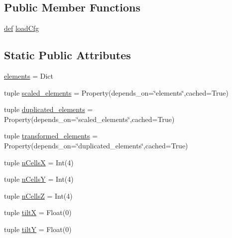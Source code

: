 \subsection*{Public Member Functions}
\begin{DoxyCompactItemize}
\item 
\hyperlink{sim_image_from_wave_8m_a72b6b8e83430abf007f20aeae4dc2f74}{def} \hyperlink{classpython_1_1models_1_1raw__models_1_1sample_1_1_sample_model_a1f0c650a5823ddfd6d9fe7aff8b706e1}{load\-Cfg}
\end{DoxyCompactItemize}
\subsection*{Static Public Attributes}
\begin{DoxyCompactItemize}
\item 
\hyperlink{classpython_1_1models_1_1raw__models_1_1sample_1_1_sample_model_a310457df13fa5efb5e41aae0e04e447f}{elements} = Dict
\item 
tuple \hyperlink{classpython_1_1models_1_1raw__models_1_1sample_1_1_sample_model_a967d917bff50ac2853db3ab230a001e6}{scaled\-\_\-elements} = Property(depends\-\_\-on=\char`\"{}elements\char`\"{},cached=True)
\item 
tuple \hyperlink{classpython_1_1models_1_1raw__models_1_1sample_1_1_sample_model_a7dad339f0323520b2952205f4dd16305}{duplicated\-\_\-elements} = Property(depends\-\_\-on=\char`\"{}scaled\-\_\-elements\char`\"{},cached=True)
\item 
tuple \hyperlink{classpython_1_1models_1_1raw__models_1_1sample_1_1_sample_model_a76199cbd9483dd4c5f2cdb6605066a52}{transformed\-\_\-elements} = Property(depends\-\_\-on=\char`\"{}duplicated\-\_\-elements\char`\"{},cached=True)
\item 
tuple \hyperlink{classpython_1_1models_1_1raw__models_1_1sample_1_1_sample_model_a247c18efc90034b0ad541d3139fb0172}{n\-Cells\-X} = Int(4)
\item 
tuple \hyperlink{classpython_1_1models_1_1raw__models_1_1sample_1_1_sample_model_a382e7fe52b95964e6a27b59be1f0a1b9}{n\-Cells\-Y} = Int(4)
\item 
tuple \hyperlink{classpython_1_1models_1_1raw__models_1_1sample_1_1_sample_model_a1505e770d394c34c3e47fb07932188ce}{n\-Cells\-Z} = Int(4)
\item 
tuple \hyperlink{classpython_1_1models_1_1raw__models_1_1sample_1_1_sample_model_aa7d73bd60a03f3c8f102c8c27d5e0c2d}{tilt\-X} = Float(0)
\item 
tuple \hyperlink{classpython_1_1models_1_1raw__models_1_1sample_1_1_sample_model_af435d19b6d10ade9fbdf46b8b436b68c}{tilt\-Y} = Float(0)

\end{DoxyCompactItemize}
